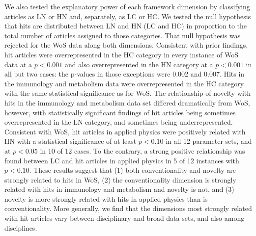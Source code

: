 \documentclass[NETN]{stjour}
\begin{document}
We also tested the explanatory power of each framework dimension by classifying articles as LN or HN and, separately, as LC or HC. We tested the null hypothesis that hits are distributed between LN and HN (LC and HC) in proportion to the total number of articles assigned to those categories.  That null hypothesis was rejected for the WoS data along both dimensions. Consistent with prior findings, hit articles were overrepresented in the HC category in every instance of WoS data at a $p<0.001$ and also overrepresented in the HN category at a $p<0.001$ in all but two cases: the p-values in those exceptions were $0.002$ and $0.007$.  Hits in the immunology and metabolism data were overrepresented in the HC category with the same statistical significance as for WoS. The relationship of novelty with hits in the immunology and metabolism data set differed dramatically from WoS, however, with statistically significant findings of hit articles being sometimes overrepresented in the LN category, and sometimes being underrepresented.  Consistent with WoS, hit articles in applied physics were positively related with HN with a statistical significance of at least $p<0.10$ in all 12 parameter sets, and at $p<0.05$ in 10 of 12 cases.  To the contrary, a strong positive relationship was found between LC and hit articles in applied physics in 5 of 12 instances with $p<0.10$. These results suggest that (1) both conventionality and novelty are strongly related to hits in WoS, (2) the conventionality dimension is strongly related with hits in immunology and metabolism and novelty is not, and (3) novelty is more strongly related with hits in applied physics than is conventionality. More generally, we find that the dimensions most strongly related with hit articles vary between disciplinary and broad data sets, and also among disciplines. 
\end{document}
